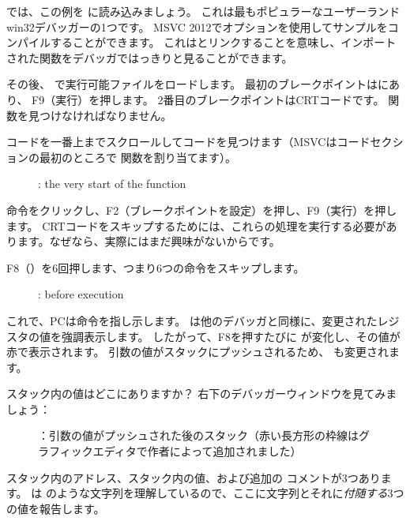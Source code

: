 \clearpage
{}
\myindex{\olly}

では、この例を \olly に読み込みましょう。 
これは最もポピュラーなユーザーランドwin32デバッガーの1つです。 
MSVC 2012でオプションを使用してサンプルをコンパイルすることができます。
これはとリンクすることを意味し、インポートされた関数をデバッガではっきりと見ることができます。

その後、 \olly で実行可能ファイルをロードします。 
最初のブレークポイントはにあり、
F9（実行）を押します。 
2番目のブレークポイントは\ac{CRT}コードです。 
\main 関数を見つけなければなりません。

コードを一番上までスクロールしてコードを見つけます（MSVCはコードセクションの最初のところで \main 関数を割り当てます）。
\begin{figure}[H]
\centering
{}
\caption{\olly: the very start of the \main function}
\label{fig:printf3_olly_1}
\end{figure}

命令をクリックし、F2（ブレークポイントを設定）を押し、F9（実行）を押します。 
\ac{CRT}コードをスキップするためには、これらの処理を実行する必要があります。なぜなら、実際にはまだ興味がないからです。

\clearpage
F8（\stepover）を6回押します、つまり6つの命令をスキップします。

\begin{figure}[H]
\centering
{}
\caption{\olly: before \printf execution}
\label{fig:printf3_olly_2}
\end{figure}

これで、\ac{PC}は命令を指し示します。 
\olly は他のデバッガと同様に、変更されたレジスタの値を強調表示します。 
したがって、F8を押すたびに \EIP が変化し、その値が赤で表示されます。 
引数の値がスタックにプッシュされるため、 \ESP も変更されます。

スタック内の値はどこにありますか？ 
右下のデバッガーウィンドウを見てみましょう：

\begin{figure}[H]
\centering

\caption{\olly ：引数の値がプッシュされた後のスタック（赤い長方形の枠線はグラフィックエディタで作者によって追加されました）}
\end{figure}

スタック内のアドレス、スタック内の値、および追加の \olly コメントが3つあります。 
\olly は \printf のような文字列を理解しているので、ここに文字列とそれに\emph{付随する}3つの値を報告します。

